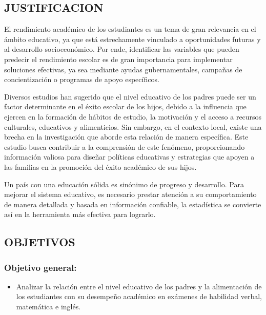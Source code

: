 \documentclass[
]{article}
\providecommand{\tightlist}{%
  \setlength{\itemsep}{0pt}\setlength{\parskip}{0pt}}
\begin{document}
\subsection{JUSTIFICACION}\label{justificacion}

El rendimiento académico de los estudiantes es un tema de gran
relevancia en el ámbito educativo, ya que está estrechamente vinculado a
oportunidades futuras y al desarrollo socioeconómico. Por ende,
identificar las variables que pueden predecir el rendimiento escolar es
de gran importancia para implementar soluciones efectivas, ya sea
mediante ayudas gubernamentales, campañas de concientización o programas
de apoyo específicos.

Diversos estudios han sugerido que el nivel educativo de los padres
puede ser un factor determinante en el éxito escolar de los hijos,
debido a la influencia que ejercen en la formación de hábitos de
estudio, la motivación y el acceso a recursos culturales, educativos y
alimenticios. Sin embargo, en el contexto local, existe una brecha en la
investigación que aborde esta relación de manera específica. Este
estudio busca contribuir a la comprensión de este fenómeno,
proporcionando información valiosa para diseñar políticas educativas y
estrategias que apoyen a las familias en la promoción del éxito
académico de sus hijos.

Un país con una educación sólida es sinónimo de progreso y desarrollo.
Para mejorar el sistema educativo, es necesario prestar atención a su
comportamiento de manera detallada y basada en información confiable, la
estadística se convierte así en la herramienta más efectiva para
lograrlo.

\subsection{OBJETIVOS}\label{objetivos}

\subsubsection{Objetivo general:}\label{objetivo-general}

\begin{itemize}
\tightlist
\item
  Analizar la relación entre el nivel educativo de los padres y la
  alimentación de los estudiantes con su desempeño académico en exámenes
  de habilidad verbal, matemática e inglés.
\end{itemize}
\end{document}
